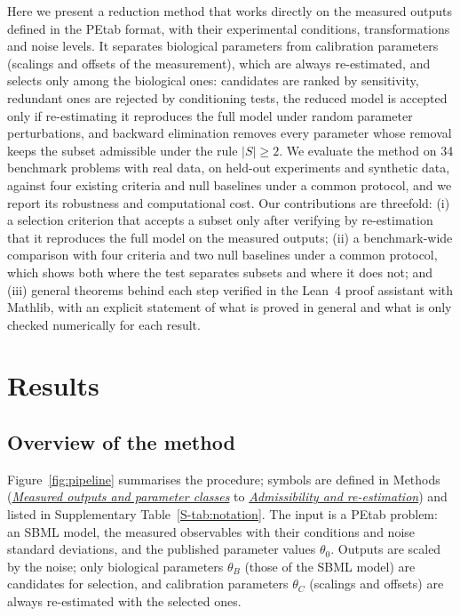\documentclass[pdflatex,sn-nature]{sn-jnl}
\theoremstyle{plain}
\newcommand{\mref}[2]{\hyperref[#1]{#2}}
\begin{document}
Here we present a reduction method that works directly on the measured outputs defined in the PEtab format\cite{bib27}, with their experimental conditions, transformations and noise levels. It separates biological parameters from calibration parameters (scalings and offsets of the measurement), which are always re-estimated, and selects only among the biological ones: candidates are ranked by sensitivity, redundant ones are rejected by conditioning tests, the reduced model is accepted only if re-estimating it reproduces the full model under random parameter perturbations, and backward elimination removes every parameter whose removal keeps the subset admissible under the rule $|S|\ge2$. We evaluate the method on 34 benchmark problems with real data\cite{bib31,bib27}, on held-out experiments and synthetic data, against four existing criteria and null baselines under a common protocol, and we report its robustness and computational cost. Our contributions are threefold: (i) a selection criterion that accepts a subset only after verifying by re-estimation that it reproduces the full model on the measured outputs; (ii) a benchmark-wide comparison with four criteria and two null baselines under a common protocol, which shows both where the test separates subsets and where it does not; and (iii) general theorems behind each step verified in the Lean~4 proof assistant with Mathlib\cite{bib19,bib21}, with an explicit statement of what is proved in general and what is only checked numerically for each result.

\section*{Results}\label{sec:results}

\subsection*{Overview of the method}\label{sec:overview}

Figure~\ref{fig:pipeline} summarises the procedure; symbols are defined in Methods (\mref{met:outputs}{\emph{Measured outputs and parameter classes}} to \mref{met:adm}{\emph{Admissibility and re-estimation}}) and listed in Supplementary Table~\ref{S-tab:notation}. The input is a PEtab problem: an SBML model, the measured observables with their conditions and noise standard deviations, and the published parameter values $\theta_0$. Outputs are scaled by the noise; only biological parameters $\theta_B$ (those of the SBML model) are candidates for selection, and calibration parameters $\theta_C$ (scalings and offsets) are always re-estimated with the selected ones.
\end{document}
